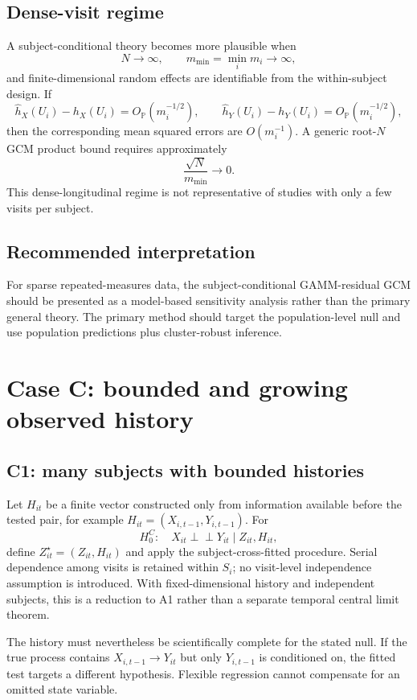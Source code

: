 \documentclass[11pt]{article}
\theoremstyle{definition}
\newcommand{\indep}{\perp\!\!\!\perp}
\newcommand{\Op}{O_{\mathbb{P}}}
\begin{document}
\subsection{Dense-visit regime}

A subject-conditional theory becomes more plausible when
\[
N\to\infty,
\qquad
m_{\min}=\min_i m_i\to\infty,
\]
and finite-dimensional random effects are identifiable from the within-subject design.
If
\[
\widehat h_X(U_i)-h_X(U_i)=\Op(m_i^{-1/2}),
\qquad
\widehat h_Y(U_i)-h_Y(U_i)=\Op(m_i^{-1/2}),
\]
then the corresponding mean squared errors are $O(m_i^{-1})$. A generic root-$N$ GCM
product bound requires approximately
\[
\frac{\sqrt N}{m_{\min}}\to0.
\]
This dense-longitudinal regime is not representative of studies with only a few visits per
subject.

\subsection{Recommended interpretation}

For sparse repeated-measures data, the subject-conditional GAMM-residual GCM should be
presented as a model-based sensitivity analysis rather than the primary general theory. The
primary method should target the population-level null and use population predictions plus
cluster-robust inference.

\section{Case C: bounded and growing observed history}

\subsection{C1: many subjects with bounded histories}

Let $H_{it}$ be a finite vector constructed only from information available before the tested
pair, for example $H_{it}=(X_{i,t-1},Y_{i,t-1})$. For
\[
H_0^C:\quad X_{it}\indep Y_{it}\mid Z_{it},H_{it},
\]
define $Z_{it}^{\star}=(Z_{it},H_{it})$ and apply the subject-cross-fitted procedure. Serial
dependence among visits is retained within $S_i$; no visit-level independence assumption is
introduced. With fixed-dimensional history and independent subjects, this is a reduction to
A1 rather than a separate temporal central limit theorem.

The history must nevertheless be scientifically complete for the stated null. If the true
process contains $X_{i,t-1}\to Y_{it}$ but only $Y_{i,t-1}$ is conditioned on, the fitted test
targets a different hypothesis. Flexible regression cannot compensate for an omitted state
variable.
\end{document}
